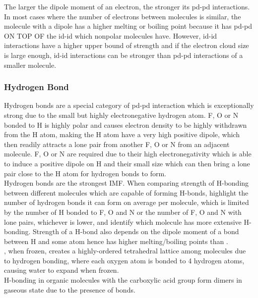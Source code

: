 \documentclass[../main]{subfiles}
\begin{document}
	The larger the dipole moment of an electron, the stronger its pd-pd interactions. \\

	In most cases where the number of electrons between molecules is similar, the molecule with a dipole has a higher melting or boiling point because it has pd-pd ON TOP OF the id-id which nonpolar molecules have. However, id-id interactions have a higher upper bound of strength and if the electron cloud size is large enough, id-id interactions can be stronger than pd-pd interactions of a smaller molecule.

	\subsubsection{Hydrogen Bond}

	Hydrogen bonds are a special category of pd-pd interaction which is exceptionally strong due to the small but highly electronegative hydrogen atom. F, O or N bonded to H is highly polar and causes electron density to be highly withdrawn from the H atom, making the H atom have a very high positive dipole, which then readily attracts a lone pair from another F, O or N from an adjacent molecule. F, O or N are required due to their high electronegativity which is able to induce a positive dipole on H and their small size which can then bring a lone pair close to the H atom for hydrogen bonds to form. \\

	Hydrogen bonds are the strongest IMF. When comparing strength of H-bonding between different molecules which are capable of forming H-bonds, highlight the number of hydrogen bonds it can form on average per molecule, which is limited by the number of H bonded to F, O and N or the number of F, O and N with lone pairs, whichever is lower, and identify which molecule has more extensive H-bonding. Strength of a H-bond also depends on the dipole moment of a bond between H and some atom hence  has higher melting/boiling points than . \\

	, when frozen, creates a highly-ordered tetrahedral lattice among molecules due to hydrogen bonding, where each oxygen atom is bonded to 4 hydrogen atoms, causing water to expand when frozen. \\

	H-bonding in organic molecules with the carboxylic acid group  form dimers in gaseous state due to the presence of  bonds. \\
\end{document}
